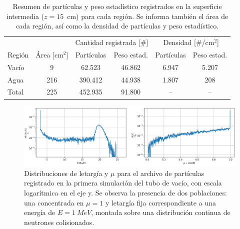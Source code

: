 \begin{table}[H]
    \centering
    \begin{tabular}{lccccc}
        \toprule
        & & \multicolumn{2}{c}{Cantidad registrada [\#]} & \multicolumn{2}{c}{Densidad [\#/cm$^2$]} \\
        \cmidrule(lr){3-4} \cmidrule(lr){5-6}
        Región & Área [cm$^2$] & Partículas & Peso estad. & Partículas & Peso estad. \\
        \midrule
        Vacío & 9 & 62.523 & 46.862 & 6.947 & 5.207 \\
        Agua  & 216 & 390.412 & 44.938 & 1.807 & 208 \\
        \midrule
        Total & 225 & 452.935 & 91.800 & -- & -- \\
        \bottomrule
    \end{tabular}
    \caption{Resumen de partículas y peso estadístico registrados en la superficie intermedia ($z = 15$~cm) para cada región. Se informa también el área de cada región, así como la densidad de partículas y peso estadístico.}
    \label{tab:particulas_pesos}
\end{table}


\begin{figure}[H]
    \centering
    \includegraphics[width=\textwidth]{figs/fig4_2.png}
    \caption{Distribuciones de letargía y $\mu$ para el archivo de partículas registrado en la primera simulación del tubo de vacío, con escala logarítmica en el eje y. Se observa la presencia de dos poblaciones: una concentrada en $\mu = 1$ y letargía fija correspondiente a una energía de $E = 1~MeV$, montada sobre una distribución continua de neutrones colisionados.}
    \label{fig:trackfile1_letargia_mu}
\end{figure}

